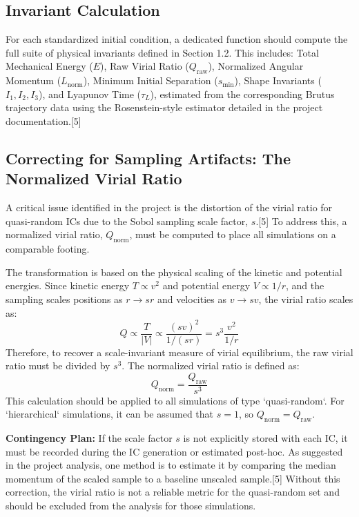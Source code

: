 \subsection{Invariant Calculation}

For each standardized initial condition, a dedicated function should compute the full suite of physical invariants defined in Section 1.2. This includes:
Total Mechanical Energy ($E$), Raw Virial Ratio ($Q_{\text{raw}}$), Normalized Angular Momentum ($L_{\text{norm}}$), Minimum Initial Separation ($s_{\text{min}}$), Shape Invariants ($I_1, I_2, I_3$), and Lyapunov Time ($\tau_L$), estimated from the corresponding Brutus trajectory data using the Rosenstein-style estimator detailed in the project documentation.[5]

\subsection{Correcting for Sampling Artifacts: The Normalized Virial Ratio}

A critical issue identified in the project is the distortion of the virial ratio for quasi-random ICs due to the Sobol sampling scale factor, $s$.[5] To address this, a normalized virial ratio, $Q_{\text{norm}}$, must be computed to place all simulations on a comparable footing.

The transformation is based on the physical scaling of the kinetic and potential energies. Since kinetic energy $T \propto v^2$ and potential energy $V \propto 1/r$, and the sampling scales positions as $r \to sr$ and velocities as $v \to sv$, the virial ratio scales as:
$$Q \propto \frac{T}{|V|} \propto \frac{(sv)^2}{1/(sr)} = s^3 \frac{v^2}{1/r}$$
Therefore, to recover a scale-invariant measure of virial equilibrium, the raw virial ratio must be divided by $s^3$. The normalized virial ratio is defined as:
$$Q_{\text{norm}} = \frac{Q_{\text{raw}}}{s^3}$$
This calculation should be applied to all simulations of type `quasi-random`. For `hierarchical` simulations, it can be assumed that $s=1$, so $Q_{\text{norm}} = Q_{\text{raw}}$.


\textbf{Contingency Plan:} If the scale factor $s$ is not explicitly stored with each IC, it must be recorded during the IC generation or estimated post-hoc. As suggested in the project analysis, one method is to estimate it by comparing the median momentum of the scaled sample to a baseline unscaled sample.[5] Without this correction, the virial ratio is not a reliable metric for the quasi-random set and should be excluded from the analysis for those simulations.

